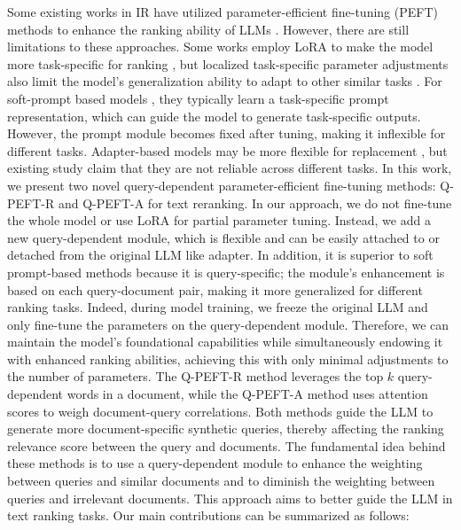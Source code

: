 \documentclass[sigconf,natbib=true,anonymous=false]{acmart}
\begin{document}
Some existing works in IR have utilized parameter-efficient fine-tuning (PEFT) methods to enhance the ranking ability of LLMs \cite{DBLP:conf/emnlp/TamLJXLLDT23,DBLP:conf/www/JungCR22, DBLP:conf/ecir/PalLDC23, DBLP:journals/corr/abs-2307-08303, DBLP:journals/csur/LiuYFJHN23, DBLP:conf/acl/ChoJSP23}. However, there are still limitations to these approaches. Some works employ LoRA to make the model more task-specific for ranking \cite{DBLP:conf/www/JungCR22}, but localized task-specific parameter adjustments also limit the model's generalization ability to adapt to other similar tasks \cite{DBLP:journals/corr/abs-2309-09055}. For soft-prompt based models \cite{DBLP:journals/corr/abs-2307-08303, DBLP:journals/csur/LiuYFJHN23, DBLP:conf/acl/ChoJSP23}, they typically learn a task-specific prompt representation, which can guide the model to generate task-specific outputs. However, the prompt module becomes fixed after tuning, making it inflexible for different tasks. Adapter-based models may be more flexible for replacement \cite{DBLP:conf/ecir/PalLDC23}, but existing study \cite{DBLP:conf/cikm/MaGZFC22} claim that they are not reliable across different tasks. In this work, we present two novel query-dependent parameter-efficient fine-tuning methods: Q-PEFT-R and Q-PEFT-A for text reranking. In our approach, we do not fine-tune the whole model or use LoRA for partial parameter tuning. Instead, we add a new query-dependent module, which is flexible and can be easily attached to or detached from the original LLM like adapter. In addition, it is superior to soft prompt-based methods because it is query-specific; the module's enhancement is based on each query-document pair, making it more generalized for different ranking tasks. Indeed, during model training, we freeze the original LLM and only fine-tune the parameters on the query-dependent module. Therefore, we can maintain the model's foundational capabilities while simultaneously endowing it with enhanced ranking abilities, achieving this with only minimal adjustments to the number of parameters. The Q-PEFT-R method leverages the top $k$ query-dependent words in a document, while the Q-PEFT-A method uses attention scores to weigh document-query correlations. Both methods guide the LLM to generate more document-specific synthetic queries, thereby affecting the ranking relevance score between the query and documents. The fundamental idea behind these methods is to use a query-dependent module to enhance the weighting between queries and similar documents and to diminish the weighting between queries and irrelevant documents. This approach aims to better guide the LLM in text ranking tasks. Our main contributions can be summarized as follows:
\end{document}
